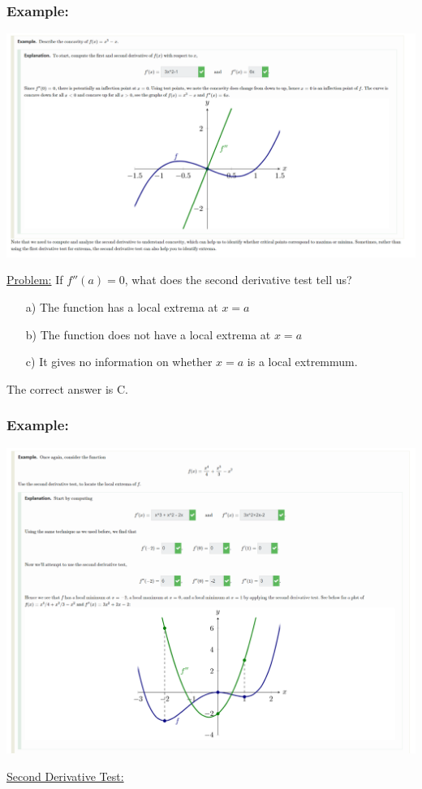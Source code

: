 \documentclass{article}
\begin{document}
\subsubsection*{Example:}
\begin{center}
\begin{minipage}{\linewidth}
    \centering
    \includegraphics[width=1.3\textwidth]{imgs/ex3.png}
\end{minipage}
\end{center}
\underline{Problem:}
If $f''(a)=0$, what does the second derivative test tell us?


\begin{enumerate}
    \item[a)] The function has a local extrema at $x=a$
    \item[b)] The function does not have a local extrema at $x=a$
    \item[c)] It gives no information on whether $x=a$ is a local extremmum.
\end{enumerate}
The correct answer is C.
\subsubsection*{Example:}
\begin{center}
\begin{minipage}{\linewidth}
    \centering
    \includegraphics[width=1.3\textwidth]{imgs/ex4.png}
\end{minipage}
\end{center}
\underline{Second Derivative Test:}
\end{document}
